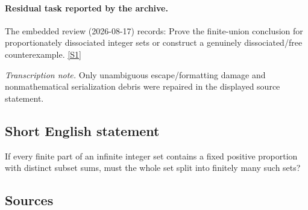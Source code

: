 \documentclass[11pt,a4paper]{article}
\newcommand{\sref}[2]{\hyperlink{source:#1:#2}{[S#2]}}
\begin{document}
\paragraph{Residual task reported by the archive.}

The embedded review (2026-08-17) records: Prove the finite-union conclusion for proportionately dissociated integer sets or construct a genuinely dissociated/free counterexample. \sref{2298}{1}

{\small\emph{Transcription note.} Only unambiguous escape/formatting damage and nonmathematical serialization debris were repaired in the displayed source statement.}

\subsection{Short English statement}

If every finite part of an infinite integer set contains a fixed positive proportion with distinct subset sums, must the whole set split into finitely many such sets?

\subsection{Sources}
\end{document}
